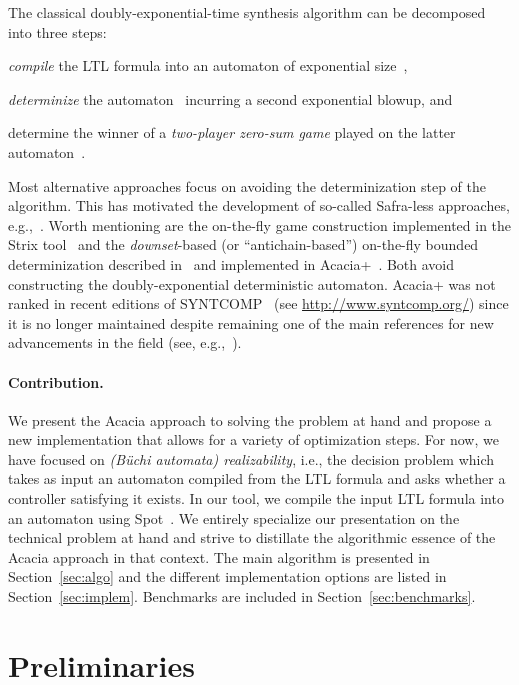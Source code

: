 \documentclass[runningheads,a4paper]{llncs}
\begin{document}
The classical doubly-exponential-time synthesis algorithm can be decomposed
into three steps:
\begin{enumerate*}
  \item \emph{compile} the LTL formula into an automaton of exponential
    size~\cite{vw84},
  \item \emph{determinize} the automaton~\cite{safra88,piterman07} incurring a
    second exponential blowup, and
  \item determine the winner of a \emph{two-player zero-sum game} played
    on the latter automaton~\cite{pr89}.
\end{enumerate*}
Most alternative approaches focus on avoiding the determinization step of the
algorithm. This has motivated the development of so-called Safra-less
approaches, e.g.,~\cite{kpv06,eks16,ekrs17,tushy17}. Worth mentioning are the
on-the-fly game construction implemented in the Strix tool~\cite{msl18} and
the \emph{downset}-based (or ``antichain-based'') on-the-fly bounded
determinization described in~\cite{fjr09} and implemented in
Acacia+~\cite{bbfjr12}. Both avoid constructing the doubly-exponential
deterministic automaton.  Acacia+ was not ranked in recent editions of
SYNTCOMP~\cite{syntcomp17} (see \url{http://www.syntcomp.org/}) since it is no longer
maintained despite remaining one of the main references for new advancements
in the field (see, e.g.,~\cite{ffrt17,ztlpv17,apsec20,lms20,bltv20}).

\paragraph*{Contribution.}
We present the Acacia approach to solving the problem at hand and propose a
new implementation that allows for a variety of optimization steps.  For now,
we have focused on \emph{(B\"uchi automata) realizability}, i.e., the decision
problem which takes as input an automaton compiled from the LTL formula and
asks whether a controller satisfying it exists. In our tool, we compile the
input LTL formula into an automaton using Spot~\cite{duret.16.atva2}.  We
entirely specialize our presentation on the technical problem at hand and
strive to distillate the algorithmic essence of the Acacia approach in that
context. The main algorithm is presented in Section~\ref{sec:algo} and the
different implementation options are listed in Section~\ref{sec:implem}.
Benchmarks are included in Section~\ref{sec:benchmarks}.

\section{Preliminaries}
\end{document}
